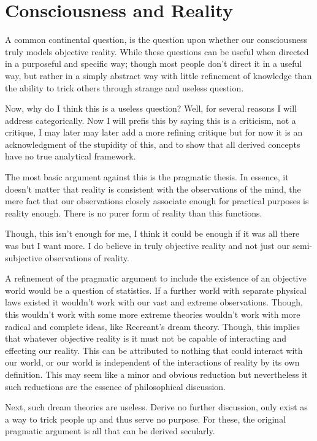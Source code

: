 \section{Consciousness and Reality}
\par A common continental question, is the question upon whether our consciousness truly models objective reality. While these questions can be useful when directed in a purposeful and specific way; though most people don't direct it in a useful way, but rather in a simply abstract way with little refinement of knowledge than the ability to trick others through strange and useless question. 
\par Now, why do I think this is a useless question? Well, for several reasons I will address categorically. Now I will prefis this by saying this is a criticism, not a critique, I may later may later add a more refining critique but for now it is an acknowledgment of the stupidity of this, and to show that all derived concepts have no true analytical framework.
\par The most basic argument against this is the pragmatic thesis. In essence, it doesn't matter that reality is consistent with the observations of the mind, the mere fact that our observations closely associate enough for practical purposes is reality enough. There is no purer form of reality than this functions.
\par Though, this isn't enough for me, I think it could be enough if it was all there was but I want more. I do believe in truly objective reality and not just our semi-subjective observations of reality.
\par A refinement of the pragmatic argument to include the existence of an objective world would be a question of statistics. If a further world with separate physical laws existed it wouldn't work with our vast and extreme observations. Though, this wouldn't work with some more extreme theories wouldn't work with more radical and complete ideas, like Recreant's dream theory. Though, this implies that whatever objective reality is it must not be capable of interacting and effecting our reality. This can be attributed to nothing that could interact with our world, or our world is independent of the interactions of reality by its own definition. This may seem like a minor and obvious reduction but nevertheless it such reductions are the essence of philosophical discussion.
\par Next, such dream theories are useless. Derive no further discussion, only exist as a way to trick people up and thus serve no purpose. For these, the original pragmatic argument is all that can be derived secularly.
